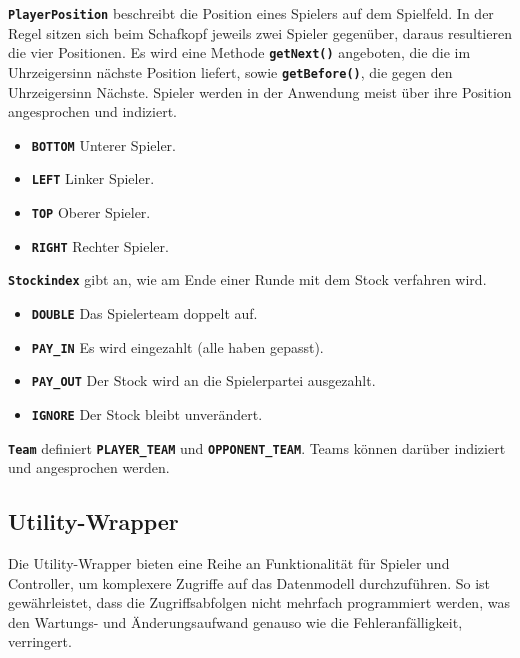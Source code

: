 \documentclass[
							a4paper, 
							11pt, 
							openany, 
							liststotoc,
							parskip=half, 
   							headings=normal
						]{scrreprt}
\begin{document}
{\textbf{\texttt{PlayerPosition}} beschreibt die Position eines Spielers auf dem Spielfeld. In der Regel sitzen sich beim Schafkopf jeweils zwei Spieler gegenüber, daraus resultieren die vier Positionen. Es wird eine Methode \textbf{\texttt{getNext()}} angeboten, die die im Uhrzeigersinn nächste Position liefert, sowie \textbf{\texttt{getBefore()}}, die gegen den Uhrzeigersinn Nächste. Spieler werden in der Anwendung meist über ihre Position angesprochen und indiziert.

\begin{itemize}
	\item \textbf{\texttt{BOTTOM}} Unterer Spieler.
	\item \textbf{\texttt{LEFT}}	Linker Spieler.
	\item \textbf{\texttt{TOP}} Oberer Spieler.
	\item \textbf{\texttt{RIGHT}} Rechter Spieler.
\end{itemize}\bigskip

\textbf{\texttt{Stockindex}} gibt an, wie am Ende einer Runde mit dem Stock verfahren wird.

\begin{itemize}
	\item \textbf{\texttt{DOUBLE}} Das Spielerteam doppelt auf.
	\item \textbf{\texttt{PAY{\_}IN}} Es wird eingezahlt (alle haben gepasst).
	\item \textbf{\texttt{PAY{\_}OUT}} Der Stock wird an die Spielerpartei ausgezahlt. 				
	\item \textbf{\texttt{IGNORE}} Der Stock bleibt unverändert.
\end{itemize}\bigskip

\textbf{\texttt{Team}} definiert \textbf{\texttt{PLAYER{\_}TEAM}} und \textbf{\texttt{OPPONENT{\_}TEAM}}. Teams können darüber indiziert und angesprochen werden.

\clearpage

\subsection{Utility-Wrapper} \label{sse:anwendung_model_utility}
Die Utility-Wrapper bieten eine Reihe an Funktionalität für Spieler und Controller, um komplexere Zugriffe auf das Datenmodell durchzuführen.
So ist gewährleistet, dass die Zugriffsabfolgen nicht mehrfach programmiert werden, was den Wartungs- und Änder\-ungs\-aufwand genauso wie die Fehleranfälligkeit, verringert.

}
\end{document}
